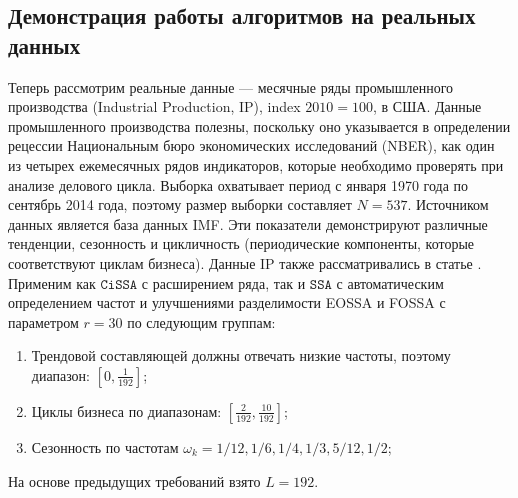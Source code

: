 \documentclass[12pt, specialist, subf
]{disser}
\theoremstyle{definition}
\newcommand{\SSA}{\texttt{SSA}}
\newcommand{\CISSA}{\texttt{CiSSA}}
\begin{document}




\subsection{Демонстрация работы алгоритмов на реальных данных}
\label{subsubsec:real_dataZz}

Теперь рассмотрим реальные данные --- месячные ряды промышленного производства (Industrial Production, IP), index $2010 = 100$, в США. Данные промышленного производства полезны, поскольку оно указывается в определении рецессии Национальным бюро экономических исследований (NBER), как один из четырех ежемесячных рядов индикаторов, которые необходимо проверять при анализе делового цикла. Выборка охватывает период с января 1970 года по сентябрь 2014 года, поэтому размер выборки составляет $N = 537$. Источником данных является база данных IMF. Эти показатели демонстрируют различные тенденции, сезонность и цикличность (периодические компоненты, которые соответствуют циклам бизнеса). Данные IP также рассматривались в статье \cite{bogalo2020}.
Применим как $\CISSA$ с расширением ряда, так и $\SSA$ с автоматическим определением частот и улучшениями разделимости EOSSA и FOSSA с параметром $r = 30$ по следующим группам:
\begin{enumerate}
	\item Трендовой составляющей должны отвечать низкие частоты, поэтому диапазон: $\left[0, \frac{1}{192}\right]$;
	\item Циклы бизнеса по диапазонам: $\left[\frac{2}{192}, \frac{10}{192}\right]$;
	\item Сезонность по частотам $\omega_k = 1/12, 1/6, 1/4, 1/3, 5/12, 1/2$;
\end{enumerate}
На основе предыдущих требований взято $L = 192$.
\end{document}
